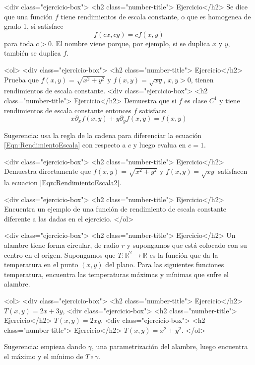 \documentclass{article}
\theoremstyle{definition}
\begin{document}
<div class="ejercicio-box"> <h2 class="number-title"> Ejercicio</h2> Se dice que una función $f$ tiene rendimientos de escala constante,
  o que es homogenea de grado 1, si satisface
  \begin{equation}\label{Eqn:RendimientoEscala}
  f(cx,cy)=cf(x,y)
  \end{equation}
  para toda $c>0$. El nombre viene porque, por ejemplo,
  si se duplica $x$ y $y$, también se duplica $f$.

  <ol>
  <div class="ejercicio-box"> <h2 class="number-title"> Ejercicio</h2> Prueba que $f(x,y)=\sqrt{x^2+y^2}$ y  $f(x,y)=\sqrt{xy}$, $x,y>0$,
    tienen rendimientos de escala constante.
  <div class="ejercicio-box"> <h2 class="number-title"> Ejercicio</h2> Demuestra que si $f$ es clase $C^1$ y tiene rendimientos
    de escala constante entonces $f$ satisface:
    \begin{equation}\label{Eqn:RendimientoEscala2}
    x \partial_x f(x,y) + y \partial_y f(x,y)=f(x,y)
    \end{equation}

    Sugerencia: usa la regla de la cadena para
    diferenciar la ecuación \eqref{Eqn:RendimientoEscala}
    con respecto a $c$ y luego evalua en $c=1$.

  <div class="ejercicio-box"> <h2 class="number-title"> Ejercicio</h2> Demuestra directamente que $f(x,y)=\sqrt{x^2+y^2}$ y $f(x,y)=\sqrt{xy}$
    satisfacen la ecuacion \eqref{Eqn:RendimientoEscala2}.

  <div class="ejercicio-box"> <h2 class="number-title"> Ejercicio</h2> Encuentra un ejemplo de una función de rendimiento de escala
    constante diferente a las dadas en el ejercicio.
  </ol>
  
<div class="ejercicio-box"> <h2 class="number-title"> Ejercicio</h2> Un alambre tiene forma circular, de radio $r$ y supongamos que está
  colocado con su centro en el origen. Supongamos que
  $T:\mathbb{R}^2 \to \mathbb{R}$ es la función que da la temperatura en
  el punto $(x,y)$ del plano. Para las siguientes funciones
  temperatura, encuentra las temperaturas máximas y mínimas
  que sufre el alambre.

  <ol>
  <div class="ejercicio-box"> <h2 class="number-title"> Ejercicio</h2> $T(x,y)=2x+3y$,
  <div class="ejercicio-box"> <h2 class="number-title"> Ejercicio</h2> $T(x,y)=2xy$,
  <div class="ejercicio-box"> <h2 class="number-title"> Ejercicio</h2> $T(x,y)=x^2+y^2$.
  </ol>

  Sugerencia: empieza dando $\gamma$, una parametrización del alambre,
  luego encuentra el máximo y el mínimo de $T\circ \gamma$.
  
\end{document}
